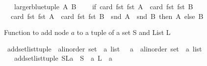\begin{isabellebody}
\ \ \ {\isachardoublequoteopen}larger{\isacharunderscore}{\kern0pt}blue{\isacharunderscore}{\kern0pt}tuple\ A\ B\ {\isacharequal}{\kern0pt}\ \isanewline
\ \ {\isacharparenleft}{\kern0pt}if\ {\isacharparenleft}{\kern0pt}card\ {\isacharparenleft}{\kern0pt}fst\ {\isacharparenleft}{\kern0pt}fst\ A{\isacharparenright}{\kern0pt}{\isacharparenright}{\kern0pt}{\isacharparenright}{\kern0pt}\ {\isachargreater}{\kern0pt}\ {\isacharparenleft}{\kern0pt}card\ {\isacharparenleft}{\kern0pt}fst\ {\isacharparenleft}{\kern0pt}fst\ B{\isacharparenright}{\kern0pt}{\isacharparenright}{\kern0pt}{\isacharparenright}{\kern0pt}\ {\isasymor}\ \isanewline
\ \ {\isacharparenleft}{\kern0pt}card\ {\isacharparenleft}{\kern0pt}fst\ {\isacharparenleft}{\kern0pt}fst\ A{\isacharparenright}{\kern0pt}{\isacharparenright}{\kern0pt}\ {\isasymge}\ card\ {\isacharparenleft}{\kern0pt}fst\ {\isacharparenleft}{\kern0pt}fst\ B{\isacharparenright}{\kern0pt}{\isacharparenright}{\kern0pt}\ {\isasymand}\ snd\ A\ {\isasymle}\ snd\ B{\isacharparenright}{\kern0pt}\ then\ A\ else\ B{\isacharparenright}{\kern0pt}{\isachardoublequoteclose}%
\begin{isamarkuptext}%
Function to add node $a$ to a tuple of a set S and List L%
\end{isamarkuptext}\isamarkuptrue%
\isamarkupfalse%
\ add{\isacharunderscore}{\kern0pt}set{\isacharunderscore}{\kern0pt}list{\isacharunderscore}{\kern0pt}tuple\ {\isacharcolon}{\kern0pt}{\isacharcolon}{\kern0pt}\ {\isachardoublequoteopen}{\isacharparenleft}{\kern0pt}{\isacharparenleft}{\kern0pt}{\isacharprime}{\kern0pt}a{\isacharcolon}{\kern0pt}{\isacharcolon}{\kern0pt}linorder\ set\ {\isasymtimes}\ {\isacharprime}{\kern0pt}a\ list{\isacharparenright}{\kern0pt}\ \ {\isasymtimes}\ {\isacharprime}{\kern0pt}a{\isacharparenright}{\kern0pt}\ {\isasymRightarrow}\ {\isacharparenleft}{\kern0pt}{\isacharprime}{\kern0pt}a{\isacharcolon}{\kern0pt}{\isacharcolon}{\kern0pt}linorder\ set\ {\isasymtimes}\ {\isacharprime}{\kern0pt}a\ list{\isacharparenright}{\kern0pt}{\isachardoublequoteclose}\ \isanewline
\ \ \ {\isachardoublequoteopen}add{\isacharunderscore}{\kern0pt}set{\isacharunderscore}{\kern0pt}list{\isacharunderscore}{\kern0pt}tuple\ {\isacharparenleft}{\kern0pt}{\isacharparenleft}{\kern0pt}S{\isacharcomma}{\kern0pt}L{\isacharparenright}{\kern0pt}{\isacharcomma}{\kern0pt}a{\isacharparenright}{\kern0pt}\ {\isacharequal}{\kern0pt}\ {\isacharparenleft}{\kern0pt}S\ {\isasymunion}\ {\isacharbraceleft}{\kern0pt}a{\isacharbraceright}{\kern0pt}{\isacharcomma}{\kern0pt}\ L\ {\isacharat}{\kern0pt}\ {\isacharbrackleft}{\kern0pt}a{\isacharbrackright}{\kern0pt}{\isacharparenright}{\kern0pt}{\isachardoublequoteclose}%

\end{isabellebody}
